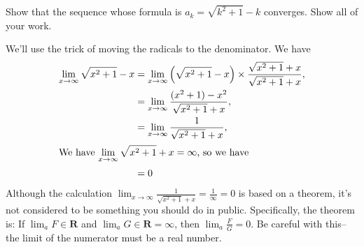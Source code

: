 \documentclass[12pt,fleqn,answers]{exam}
\newcommand{\reals}{\mathbf{R}}
\begin{document}
\begin{questions}
  \question [2] Show that the sequence whose formula is 
  $a_k = \sqrt{k^2+1} - k$ converges. Show all of your work.
  \begin{solution}%
  We'll use the trick of moving the radicals to the denominator. We have
  \begin{align*}
  \lim_{x \to \infty} \sqrt{x^2+1} - x  &= \lim_{x \to \infty} \left(\sqrt{x^2+1} - x \right)   \times \frac{\sqrt{x^2+1}  + x}{\sqrt{x^2+1}  + x}, \\
                                                                 &= \lim_{x \to \infty} \frac{(x^2+1) - x^2}{\sqrt{x^2+1}  + x}, \\
                                                                 &=  \lim_{x \to \infty} \frac{1}{\sqrt{x^2+1}  + x}, \\
      \intertext{We have $\displaystyle \lim_{x \to \infty}    \sqrt{x^2+1}  + x = \infty$, so we have}                                                        
                                                                 &=  0
  \end{align*}
  Although the calculation $\displaystyle \lim_{x \to \infty} \frac{1}{\sqrt{x^2+1}  + x} = \frac{1}{\infty} = 0$ is based on a theorem, it's not considered   to be something you should do in public. Specifically, the theorem is: If $\displaystyle \lim_a   F \in \reals$ and $\displaystyle \lim_a G \in \reals = \infty$,
  then $\displaystyle \lim_a \frac{F}{G} = 0$. Be careful with this--the limit of the numerator must be a real number.
  \end{solution}


\end{questions}
\end{document}
